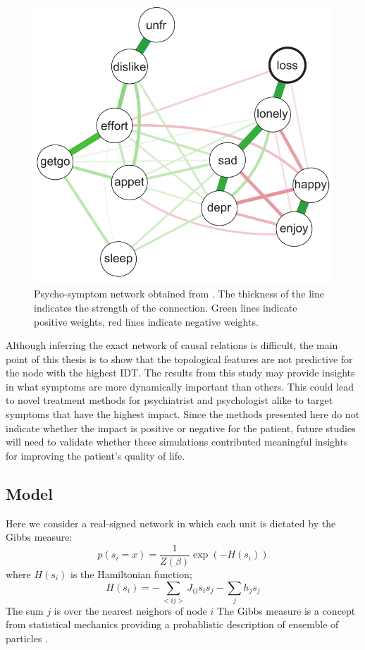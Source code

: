 \documentclass[twoside, twocolumn]{article}
\begin{document}
	
	\begin{figure}[!h]
		\centering \includegraphics[width = .6 \textwidth ]{figures/psycho_network}
		\caption{Psycho-symptom network obtained from \cite{Epskamp2017}. The thickness of the line indicates the strength of the connection. Green lines indicate positive weights, red lines indicate negative weights.}
		\label{fig:network}
	\end{figure}
	
	Although inferring the exact network of causal relations is difficult, the main point of this thesis is to show that the topological features are not predictive for the node with the highest IDT. The results from this study may provide insights in what symptoms are more dynamically important than others. This could lead to novel treatment methods for psychiatrist and psychologist alike to target symptoms that have the highest impact. Since the methods presented here do not indicate whether the impact is positive or negative for the patient, future studies will  need to validate whether these simulations contributed meaningful insights for improving the patient's quality of life. 
	
	
	\subsection{Model}\label{sec:model}
	Here we consider a real-signed network in which each unit is dictated by the Gibbs measure: 
	\begin{equation}
	p(s_i = x) = \frac{1}{Z(\beta)} \exp(-H(s_i))
	\end{equation}
	where $H(s_i)$ is the Hamiltonian function;
	$$H(s_i) = -\sum_{<ij>} J_{ij} s_i s_j - \sum_j h_j s_j$$
	The sum $j$ is over the nearest neighors of node $i$  
	The Gibbs measure is a concept from statistical mechanics providing a probablistic description of ensemble of particles \cite{Gibbs1996}. 
	
\end{document}
